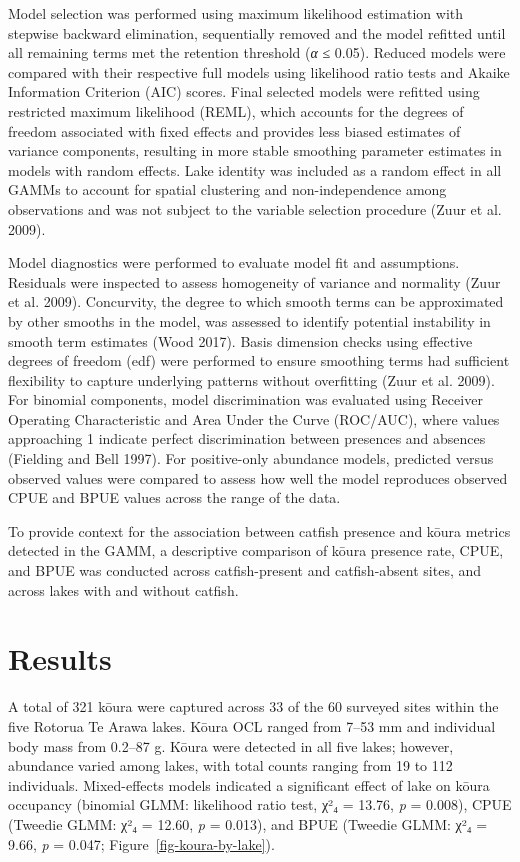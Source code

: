 \documentclass[
  12pt,
  a4paper,
  oneside]{scrbook}
\begin{document}
Model selection was performed using maximum likelihood estimation with
stepwise backward elimination, sequentially removed and the model
refitted until all remaining terms met the retention threshold (\emph{α}
≤ 0.05). Reduced models were compared with their respective full models
using likelihood ratio tests and Akaike Information Criterion (AIC)
scores. Final selected models were refitted using restricted maximum
likelihood (REML), which accounts for the degrees of freedom associated
with fixed effects and provides less biased estimates of variance
components, resulting in more stable smoothing parameter estimates in
models with random effects. Lake identity was included as a random
effect in all GAMMs to account for spatial clustering and
non-independence among observations and was not subject to the variable
selection procedure (Zuur et al. 2009).

Model diagnostics were performed to evaluate model fit and assumptions.
Residuals were inspected to assess homogeneity of variance and normality
(Zuur et al. 2009). Concurvity, the degree to which smooth terms can be
approximated by other smooths in the model, was assessed to identify
potential instability in smooth term estimates (Wood 2017). Basis
dimension checks using effective degrees of freedom (edf) were performed
to ensure smoothing terms had sufficient flexibility to capture
underlying patterns without overfitting (Zuur et al. 2009). For binomial
components, model discrimination was evaluated using Receiver Operating
Characteristic and Area Under the Curve (ROC/AUC), where values
approaching 1 indicate perfect discrimination between presences and
absences (Fielding and Bell 1997). For positive-only abundance models,
predicted versus observed values were compared to assess how well the
model reproduces observed CPUE and BPUE values across the range of the
data.

To provide context for the association between catfish presence and
kōura metrics detected in the GAMM, a descriptive comparison of kōura
presence rate, CPUE, and BPUE was conducted across catfish-present and
catfish-absent sites, and across lakes with and without catfish.

\section{Results}\label{results-1}

A total of 321 kōura were captured across 33 of the 60 surveyed sites
within the five Rotorua Te Arawa lakes. Kōura OCL ranged from 7--53 mm
and individual body mass from 0.2--87 g. Kōura were detected in all five
lakes; however, abundance varied among lakes, with total counts ranging
from 19 to 112 individuals. Mixed-effects models indicated a significant
effect of lake on kōura occupancy (binomial GLMM: likelihood ratio test,
χ²₄ = 13.76, \emph{p} = 0.008), CPUE (Tweedie GLMM: χ²₄ = 12.60,
\emph{p} = 0.013), and BPUE (Tweedie GLMM: χ²₄ = 9.66, \emph{p} = 0.047;
Figure~\ref{fig-koura-by-lake}).
\end{document}
